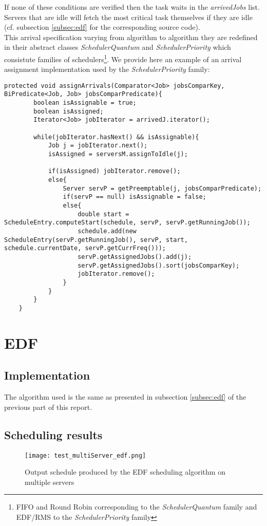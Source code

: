 \documentclass[./report.tex]{subfiles}
\begin{document}
If none of these conditions are verified then the task waits in the \textit{arrivedJobs} list. Servers that are idle will fetch the most critical task themselves if they are idle (cf. subsection \ref{subsec:edf} for the corresponding source code).\\

This arrival specification varying from algorithm to algorithm they are redefined in their abstract classes \textit{SchedulerQuantum} and \textit{SchedulerPriority} which consistute families of schedulers\footnote{FIFO and Round Robin corresponding to the \textit{SchedulerQuantum} family and EDF/RMS to the \textit{SchedulerPriority} family}. We provide here an example of an arrival assignment implementation used by the \textit{SchedulerPriority} family:

\begin{lstlisting}[style=Java, caption={Source code of the \textit{assignArrivals()} used by the \textit{SchedulerPriority} family of Schedulers}]
	protected void assignArrivals(Comparator<Job> jobsComparKey, BiPredicate<Job, Job> jobsComparPredicate){
		boolean isAssignable = true;
		boolean isAssigned;
		Iterator<Job> jobIterator = arrivedJ.iterator();
		
		while(jobIterator.hasNext() && isAssignable){
			Job j = jobIterator.next();
			isAssigned = serversM.assignToIdle(j);
			
			if(isAssigned) jobIterator.remove();
			else{
				Server servP = getPreemptable(j, jobsComparPredicate);
				if(servP == null) isAssignable = false;
				else{
					double start = ScheduleEntry.computeStart(schedule, servP, servP.getRunningJob());
					schedule.add(new ScheduleEntry(servP.getRunningJob(), servP, start, schedule.currentDate, servP.getCurrFreq()));
					servP.getAssignedJobs().add(j);
					servP.getAssignedJobs().sort(jobsComparKey);
					jobIterator.remove();
				}
			}
		}
	}
\end{lstlisting}
 
\newpage
\section{EDF}
\subsection{Implementation}
The algorithm used is the same as presented in subsection \ref{subsec:edf} of the previous part of this report.

\subsection{Scheduling results}
\begin{figure}[!h]
	\center
	\texttt{[image: test\_multiServer\_edf.png]}
	\caption{Output schedule produced by the EDF scheduling algorithm on multiple servers}
	\label{fig:multiServer_edf} 
\end{figure}
\end{document}
